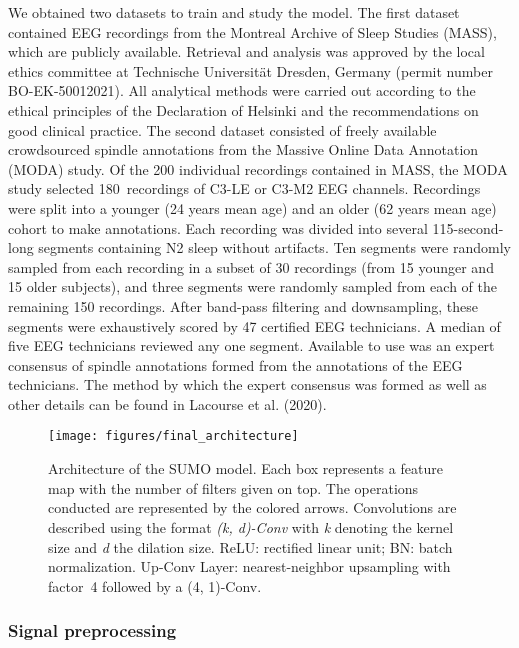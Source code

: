 \documentclass[fleqn,twocolumn,10pt]{wlscirep}
\begin{document}
We obtained two datasets to train and study the model. 
The first dataset contained EEG recordings from
the Montreal Archive of Sleep Studies (MASS)\cite{OReilly2014},
which are publicly available\cite{MASS2020}.
Retrieval and analysis was approved by the local ethics committee 
at Technische Universität Dresden, Germany (permit number BO-EK-50012021).
All analytical methods were carried out according to the ethical principles of the Declaration of Helsinki\cite{WMA2001} and the recommendations on good clinical practice\cite{EMA2021}.
The second dataset consisted of freely available crowdsourced spindle annotations from the Massive Online Data Annotation
(MODA) study\cite{Lacourse2020}.  Of the 200 individual recordings
contained in MASS, the MODA study selected 180~recordings of C3-LE or C3-M2 EEG channels.
Recordings were split
into a younger (24 years mean age) and an older (62 years mean age) cohort
to make annotations.
Each recording was divided into several 115-second-long segments containing N2
sleep without artifacts.  Ten segments were 
randomly sampled from each recording in a subset of 30
recordings (from 15 younger and 15 older subjects), and three segments were 
randomly sampled 
from each of the
remaining 150 recordings.
After band-pass filtering and downsampling, these segments were exhaustively scored by 
47 certified EEG technicians.
A median of five EEG technicians reviewed any one segment.
Available to use was an expert consensus of spindle annotations formed from the
annotations of the EEG technicians.
The method by which the expert consensus was formed as well
as other details can be found in Lacourse et al. (2020)\cite{Lacourse2020}.


\begin{figure*}[t]
	\centering
	\texttt{[image: figures/final\_architecture]}
	\caption{
		Architecture of the SUMO model. 
		Each box represents a feature map with the number of filters given on top.
		The operations conducted are represented by the colored arrows.
		Convolutions are described using the format \textit{(k, d)-Conv} with \textit{k} denoting the kernel size and \textit{d} the dilation size.
		ReLU: rectified linear unit; BN: batch normalization.
		Up-Conv Layer: nearest-neighbor upsampling with factor~4 followed by a (4, 1)-Conv.
	}
	\label{fig:final-architecture}
\end{figure*}

\subsubsection{Signal preprocessing}
\end{document}

